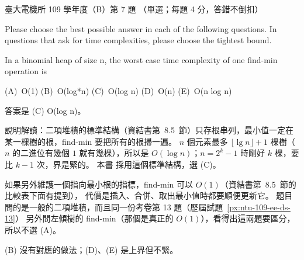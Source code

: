 \begin{pastexam}[label={px:ntu-109-ee-ds-07}]{臺大電機所 109 學年度（B）第 7 題}
（單選；每題 4 分，答錯不倒扣）

Please choose the best possible answer in each of the following questions. In questions that ask
for time complexities, please choose the tightest bound.

In a binomial heap of size n, the worst case time complexity of one find-min operation is

(A)~O(1) \qquad (B)~O(log*n) \qquad (C)~O(log n) \qquad (D)~O(n) \qquad (E)~O(n log n)
\end{pastexam}

\begin{pastsoln}
答案是 (C) O(log n)。

說明解讀：二項堆積的標準結構（資結書第~8.5~節）只存根串列，最小值一定在某一棵樹的根，find-min
要把所有的根掃一遍。 $n$ 個元素最多 $\lfloor \lg n \rfloor + 1$ 棵樹（$n$ 的二進位有幾個 $1$
就有幾棵），所以是 $O(\log n)$；$n = 2^k - 1$ 時剛好 $k$ 棵，要比 $k - 1$ 次，界是緊的。 本書
採用這個標準結構，選 (C)。

如果另外維護一個指向最小根的指標，find-min 可以 $O(1)$（資結書第~8.5~節的比較表下面有提到），
代價是插入、合併、取出最小值時都要順便更新它。 題目問的是一般的二項堆積，而且同一份考卷第 13 題（歷屆試題~\ref{px:ntu-109-ee-ds-13}）
另外問左傾樹的 find-min（那個是真正的 $O(1)$），看得出這兩題要區分，所以不選 (A)。

(B) 沒有對應的做法；(D)、(E) 是上界但不緊。
\end{pastsoln}
